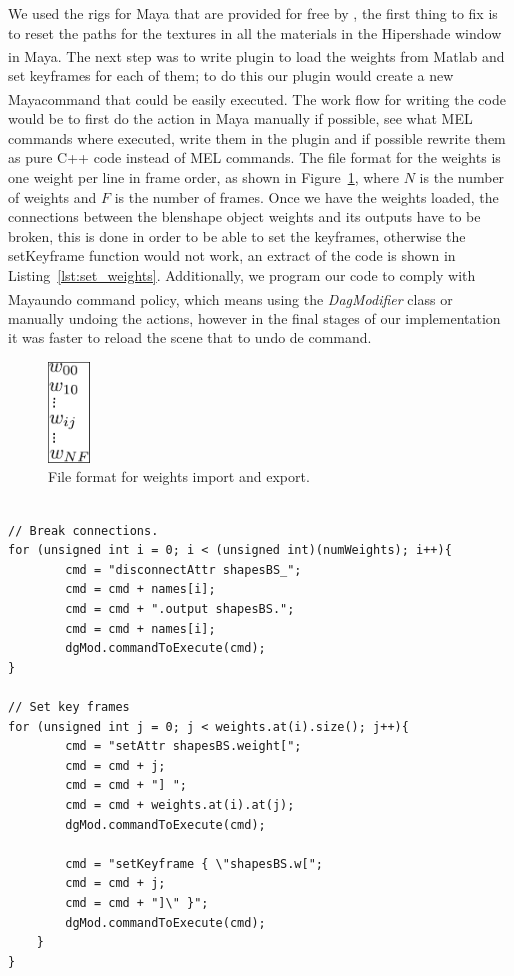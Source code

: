 \documentclass[11pt]{report}
\newcommand{\Maya}{Maya\textsuperscript\textregistered}
\begin{document}
We used the rigs for Maya that are provided for free by \cite{FaceWareRigsWeb}, the first thing to fix is to reset the paths for the textures in all the materials in the Hipershade window in \Maya.
The next step was to write plugin to load the weights from Matlab and set keyframes for each of them; to do this our plugin would create a new \Maya command that could be easily executed. 
The work flow for writing the code would be to first do the action in Maya manually if possible, see what MEL commands where executed, write them in the plugin and if possible rewrite them as pure C++ code instead of MEL commands.
The file format for the weights is one weight per line in frame order, as shown in Figure~\ref{fig:file_format}, where $N$ is the number of weights and $F$ is the number of frames.
Once we have the weights loaded, the connections between the blenshape object weights and its outputs have to be broken, this is done in order to be able to set the keyframes, otherwise the setKeyframe function would not work, an extract of the code is shown in Listing~\ref{lst:set_weights}.
Additionally, we program our code to comply with \Maya undo command policy, which means using the \emph{DagModifier} class or manually undoing the actions, however in the final stages of our implementation it was faster to reload the scene that to undo de command.

\begin{figure}[htbp!]
\centering
\includegraphics[width=0.1\textwidth]{img/file_format}
	\caption{File format for weights import and export.}
	\label{fig:file_format}
\end{figure}

\begin{lstlisting}[caption = Breaking the weights connections and setting keyframes., label = lst:set_weights, frame=single, float]

// Break connections.
for (unsigned int i = 0; i < (unsigned int)(numWeights); i++){
		cmd = "disconnectAttr shapesBS_";
		cmd = cmd + names[i];
		cmd = cmd + ".output shapesBS.";
		cmd = cmd + names[i];
		dgMod.commandToExecute(cmd);
}

// Set key frames
for (unsigned int j = 0; j < weights.at(i).size(); j++){
		cmd = "setAttr shapesBS.weight[";
		cmd = cmd + j;
		cmd = cmd + "] ";
		cmd = cmd + weights.at(i).at(j);
		dgMod.commandToExecute(cmd);
		
		cmd = "setKeyframe { \"shapesBS.w[";
		cmd = cmd + j;
		cmd = cmd + "]\" }";
		dgMod.commandToExecute(cmd);
	}
}
\end{lstlisting}
\end{document}
